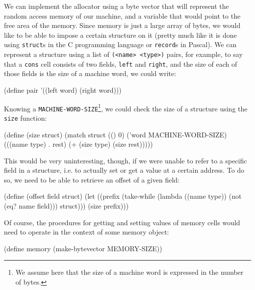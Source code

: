 We can implement the allocator using a byte vector that will represent
the random access memory of our machine, and a variable that would point
to the free area of the memory. Since memory is just a large array of
bytes, we would like to be able to impose a certain structure on it
(pretty much like it is done using \texttt{struct}s in the C programming
language or \texttt{record}s in Pascal). We can represent a structure
using a list of \texttt{(<name> <type>)} pairs, for example, to say
that a \texttt{cons} cell consists of two fields, \texttt{left} and
\texttt{right}, and the size of each of those fields is the size of
a machine word, we could write:

\begin{Snippet}
(define pair
  '((left word)
    (right word)))
\end{Snippet}

Knowing a \texttt{MACHINE-WORD-SIZE}\footnote{We assume here that the
  size of a machine word is expressed in the number of bytes.}, we
could check the size of a structure using the \texttt{size} function:

\begin{Snippet}
(define (size struct)
  (match struct
    (()
     0)
    ('word
     MACHINE-WORD-SIZE)
    (((name type) . rest)
     (+ (size type) (size rest)))))
\end{Snippet}

This would be very uninteresting, though, if we were unable to
refer to a specific field in a structure, i.e. to actually set
or get a value at a certain address. To do so, we need to
be able to retrieve an offset of a given field:

\begin{Snippet}
(define (offset field struct)
  (let ((prefix (take-while (lambda ((name type))
                              (not (eq? name field)))
                            struct)))
    (size prefix)))
\end{Snippet}



Of course, the procedures for getting and setting values of memory
cells would need to operate in the context of some memory object:

\begin{Snippet}
(define memory (make-bytevector MEMORY-SIZE))
\end{Snippet}

